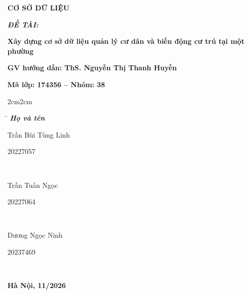 \begin{titlepage}
\begin{center}
    \vspace{7pt}
    \textbf{CƠ SỞ DỮ LIỆU}
\end{center}

\vspace{15pt}
\begin{flushleft}

    \fontsize{14pt}{17pt}\selectfont
    \textbf{\textsl{ĐỀ TÀI:}}
\end{flushleft}

\begin{center}
    \fontsize{14pt}{14pt}\selectfont
    \textbf{\textrm{Xây dựng cơ sở dữ liệu quản lý cư dân và biến động cư trú tại một phường}}
\vspace{10pt}
\end{center}
\begin{center}
\textbf{GV hướng dẫn: ThS. Nguyễn Thị Thanh Huyền}





\vspace{10pt}
\textbf{Mã lớp: 174356 \quad -- \quad Nhóm: 38}
\end{center}
\begin{adjustwidth}{2cm}{2cm}
\begin{tabbing}
\hspace{8cm}\=\hspace{3cm} \kill
{\it \textbf{Họ và tên}}\\
\begin{bfseries}Trần Bùi Tùng Linh\end{bfseries}\> \begin{bfseries}20227057\end{bfseries}\\
\begin{bfseries}Trần Tuấn Ngọc\end{bfseries}\> \begin{bfseries}20227064\end{bfseries}\\
\begin{bfseries}Dương Ngọc Ninh\end{bfseries}\> \begin{bfseries}20237469\end{bfseries}\\
\end{tabbing}
\end{adjustwidth}
\vspace{15pt}
\begin{center}
    \textbf{Hà Nội, 11/2026}
\end{center}
\end{titlepage}
